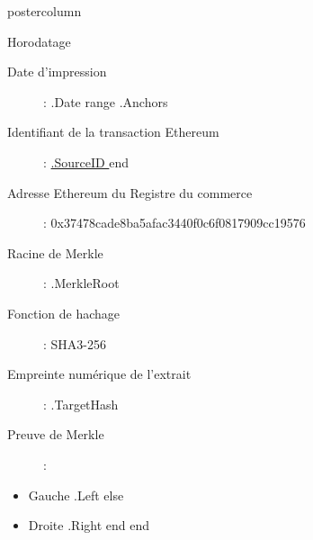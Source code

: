 \documentclass[roundedcorners=true, titleposition=center]{beamerthemeruhuisstijlposter}
\begin{document}
\begin{frame}
\begin{columns}
\begin{column}{0.95\textwidth}
\begin{beamercolorbox}[center, wd=\textwidth]{postercolumn}
\begin{minipage}[T]{0.95\textwidth}
    \hfill
\parbox[t][\columnheight]{\textwidth}{%

\begin{block}{Horodatage}
\begin{description}
\item [Date d'impression] :\linebreak
{{ .Date }}
{{ range .Anchors }}
\item [Identifiant de la transaction Ethereum] :\linebreak
\href{https://etherscan.io/tx/0x{{ .SourceID }} }{ {{.SourceID }} }
{{ end }}
\item[Adresse Ethereum du Registre du commerce] :\linebreak
0x37478cade8ba5afac3440f0c6f0817909cc19576
\item[Racine de Merkle] :\linebreak
{{ .MerkleRoot }}
\item[Fonction de hachage] : \linebreak
SHA3-256
\item[Empreinte numérique de l'extrait] :\linebreak
{{ .TargetHash }}
\item[Preuve de Merkle] :
\end{description}
\begin{itemize}
{{ range .Proof }}
    {{ if .Left }}
        \item Gauche {{ .Left }}
    {{ else }}
        \item Droite {{ .Right }}
    {{ end }}
{{ end }}
\end{itemize}
\end{block}
}
\end{minipage}
\end{beamercolorbox}
\end{column}
\end{columns}
\end{frame}
\end{document}
